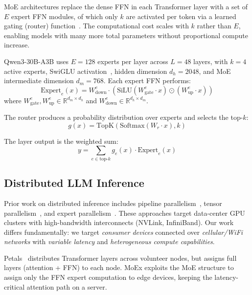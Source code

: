 \documentclass[11pt,a4paper]{article}
\begin{document}
MoE architectures replace the dense FFN in each Transformer layer with
a set of $E$ expert FFN modules, of which only $k$ are activated per
token via a learned gating (router)
function~\cite{shazeer2017outrageously}. The computational cost scales
with $k$ rather than $E$, enabling models with many more total
parameters without proportional compute increase.

Qwen3-30B-A3B uses $E=128$ experts per layer across $L=48$ layers,
with $k=4$ active experts, SwiGLU activation~\cite{shazeer2020glu},
hidden dimension $d_h=2048$, and MoE intermediate dimension
$d_m=768$. Each expert FFN performs:
\begin{equation}
  \text{Expert}_e(x) = W_{\text{down}}^e \cdot
    \left(\text{SiLU}(W_{\text{gate}}^e \cdot x) \odot
          (W_{\text{up}}^e \cdot x)\right)
  \label{eq:swiglu}
\end{equation}
where $W_{\text{gate}}^e, W_{\text{up}}^e \in \mathbb{R}^{d_m \times d_h}$
and $W_{\text{down}}^e \in \mathbb{R}^{d_h \times d_m}$.

The router produces a probability distribution over experts and selects
the top-$k$:
\begin{equation}
  g(x) = \text{TopK}\left(\text{Softmax}(W_r \cdot x), k\right)
  \label{eq:router}
\end{equation}

The layer output is the weighted sum:
\begin{equation}
  y = \sum_{e \in \text{top-}k} g_e(x) \cdot \text{Expert}_e(x)
  \label{eq:merge}
\end{equation}

\subsection{Distributed LLM Inference}

Prior work on distributed inference includes pipeline
parallelism~\cite{huang2019gpipe}, tensor
parallelism~\cite{shoeybi2019megatron}, and expert
parallelism~\cite{lepikhin2020gshard}. These approaches target
data-center GPU clusters with high-bandwidth interconnects (NVLink,
InfiniBand). Our work differs fundamentally: we target \emph{consumer
devices} connected over \emph{cellular/WiFi networks} with
\emph{variable latency} and \emph{heterogeneous compute capabilities}.

Petals~\cite{borzunov2023petals} distributes Transformer layers across
volunteer nodes, but assigns full layers (attention + FFN) to each
node. MoEx exploits the MoE structure to assign only the FFN expert
computation to edge devices, keeping the latency-critical attention
path on a server.
\end{document}
